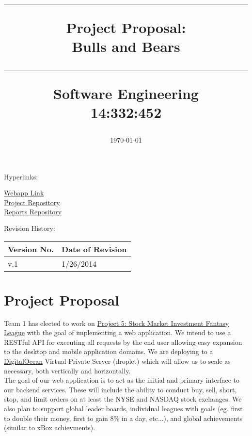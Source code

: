 \documentclass[11pt,letterpaper,oneside]{memoir}
\title{%
{\color{color2} \hrule}\vspace{1cm}
\Huge{\color{color1} Project Proposal:\\Bulls and Bears %
\vspace{1cm}
{\color{color2} \hrule}\vspace{1cm}}
\Large{ \color{color2} Software Engineering\\
14:332:452}
}
\author{\huge{\color{color0}Team 1:\\}\vskip.1in
\Large{\href{mailto:david.patrzeba@gmail.com}{David Patrzeba}\\
\href{mailto:eric.jacob.10@gmail.com}{Eric Jacob}\\
\href{mailto:evanarbeitman@gmail.edu}{Evan Arbeitman}\\
\href{mailto:christopher.a.mancuso@gmail.com}{Christopher Mancuso}\\
\href{mailto:dkarivalis@gmail.edu}{David Karivalis}\\
\href{mailto:jdlziegler@gmail.com}{Jesse Ziegler}}}
\date{\today}
\begin{document}
\titleGM    %

Hyperlinks:\\
\begin{center}
\href{http://192.241.248.91}{Webapp Link}\\
\href{https://github.com/dkarivalis/SEP_SMIFL}{Project Repository}\\
\href{https://github.com/dkarivalis/SEP_SMIFL_reports}{Reports Repository}\\
\end{center}

Revision History:
\begin{longtable}{|p{1.6in}|p{2.6in}|}
\hline
{\large \color{color1}Version No.}&{\large \color{color1}Date of Revision} \\ \hline
v.1&1/26/2014  \\ \hline 
\end{longtable}

\pagebreak  %
\tableofcontents %


\chapter{Project Proposal}
\label{proposal}
Team 1 has elected to work on \href{http://ece.rutgers.edu/~marsic/books/SE/projects/}
{Project 5: Stock Market Investment Fantasy League} with the goal of implementing a
web application. We intend to use a RESTful API for executing all requests by the end user
allowing easy expansion to the desktop and mobile application domains. We are deploying to
a \href{http://www.digitialocean.com}{DigitalOcean} Virtual Private Server (droplet) which
will allow us to scale as necessary, both vertically and horizontally.\\

The goal of our web application is to act as the initial and primary interface to our backend
services. These will include the ability to conduct buy, sell, short, stop, and limit orders on
at least the NYSE and NASDAQ stock exchanges.  We also plan to support global leader boards,
individual leagues with goals (eg. first to double their money, first to gain 8\% in a day, etc...),
and global achievements (similar to xBox achievments).\\
\end{document}
